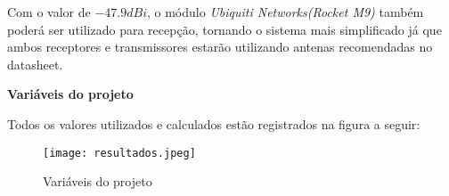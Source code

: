 Com o valor de $-47.9dBi$, o módulo \textit{Ubiquiti Networks(Rocket M9)} também poderá ser utilizado para recepção, tornando o sistema mais simplificado já que ambos receptores e transmissores estarão utilizando antenas recomendadas no datasheet.

\newpage
\begin{center}
	\Large \textbf{Variáveis do projeto}
\end{center}
Todos os valores utilizados e calculados estão registrados na figura a seguir:
\begin{figure}[h]
	\centering
	\texttt{[image: resultados.jpeg]}
	\label{fig:result}
	\caption{Variáveis do projeto}
\end{figure} 

